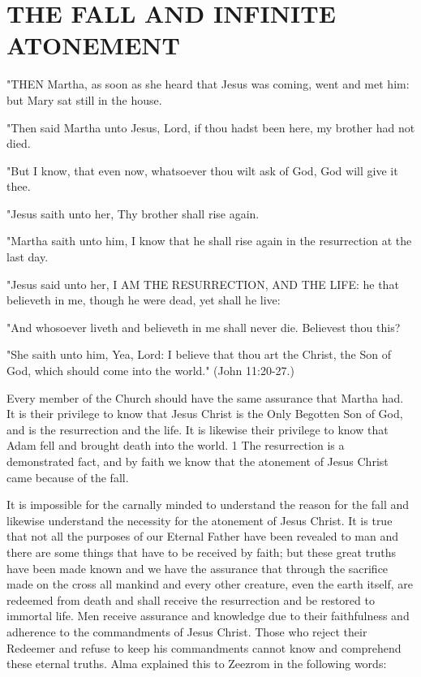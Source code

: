 \chapter{THE FALL AND INFINITE ATONEMENT}

"THEN Martha, as soon as she heard that Jesus was coming, went and met him: but Mary sat
still in the house.

"Then said Martha unto Jesus, Lord, if thou hadst been here, my brother had not died.

"But I know, that even now, whatsoever thou wilt ask of God, God will give it thee.

"Jesus saith unto her, Thy brother shall rise again.

"Martha saith unto him, I know that he shall rise again in the resurrection at the last day.

"Jesus said unto her, I AM THE RESURRECTION, AND THE LIFE: he that believeth in
me, though he were dead, yet shall he live:

"And whosoever liveth and believeth in me shall never die. Believest thou this?

"She saith unto him, Yea, Lord: I believe that thou art the Christ, the Son of God, which
should come into the world." (John 11:20-27.)

Every member of the Church should have the same assurance that Martha had. It is their
privilege to know that Jesus Christ is the Only Begotten Son of God, and is the resurrection
and the life. It is likewise their privilege to know that Adam fell and brought death into the
world. 1 The resurrection is a demonstrated fact, and by faith we know that the atonement of
Jesus Christ came because of the fall.

It is impossible for the carnally minded to understand the reason for the fall and likewise
understand the necessity for the atonement of Jesus Christ. It is true that not all the purposes
of our Eternal Father have been revealed to man and there are some things that have to be
received by faith; but these great truths have been made known and we have the assurance
that through the sacrifice made on the cross all mankind and every other creature, even the
earth itself, are redeemed from death and shall receive the resurrection and be restored to
immortal life. Men receive assurance and knowledge due to their faithfulness and adherence
to the commandments of Jesus Christ. Those who reject their Redeemer and refuse to keep
his commandments cannot know and comprehend these eternal truths. Alma explained this to
Zeezrom in the following words:

